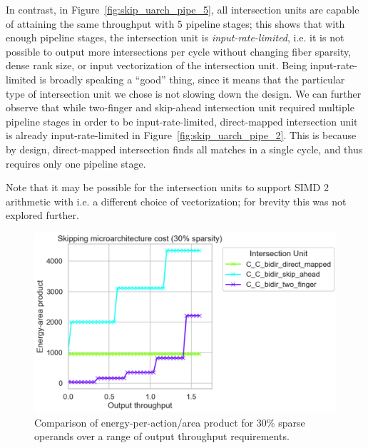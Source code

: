 In contrast, in Figure~\ref{fig:skip_uarch_pipe_5}, all intersection units are capable of attaining the same throughput with 5 pipeline stages; this shows that with enough pipeline stages, the intersection unit is \textit{input-rate-limited}, i.e. it is not possible to output more intersections per cycle without changing fiber sparsity, dense rank size, or input vectorization of the intersection unit. Being input-rate-limited is broadly speaking a ``good'' thing, since it means that the particular type of intersection unit we chose is not slowing down the design. We can further observe that while two-finger and skip-ahead intersection unit required multiple pipeline stages in order to be input-rate-limited, direct-mapped intersection unit is already input-rate-limited in Figure~\ref{fig:skip_uarch_pipe_2}. This is because by design, direct-mapped intersection finds all matches in a single cycle, and thus requires only one pipeline stage.

Note that it may be possible for the intersection units to support SIMD 2 arithmetic  with i.e. a different choice of vectorization; for brevity this was not explored further.

\begin{figure}[H]
\includegraphics[width=\textwidth]{figures/skip_uarch_sparsity_30pct.png}
\caption{Comparison of energy-per-action/area product for 30\% sparse operands over a range of output throughput requirements.}
\label{fig:skip_uarch_sparsity_30pct}
\end{figure}

